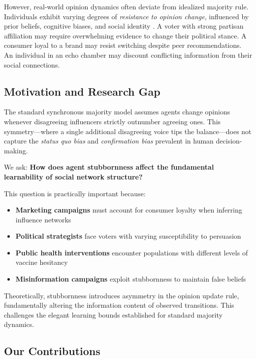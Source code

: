 \documentclass[conference]{IEEEtran}
\begin{document}
However, real-world opinion dynamics often deviate from idealized majority rule. Individuals exhibit varying degrees of \emph{resistance to opinion change}, influenced by prior beliefs, cognitive biases, and social identity \cite{auletta2015minority}. A voter with strong partisan affiliation may require overwhelming evidence to change their political stance. A consumer loyal to a brand may resist switching despite peer recommendations. An individual in an echo chamber may discount conflicting information from their social connections.

\subsection{Motivation and Research Gap}

The standard synchronous majority model assumes agents change opinions whenever disagreeing influencers strictly outnumber agreeing ones. This symmetry---where a single additional disagreeing voice tips the balance---does not capture the \emph{status quo bias} and \emph{confirmation bias} prevalent in human decision-making. 

We ask: \textbf{How does agent stubbornness affect the fundamental learnability of social network structure?}

This question is practically important because:
\begin{itemize}
\item \textbf{Marketing campaigns} must account for consumer loyalty when inferring influence networks
\item \textbf{Political strategists} face voters with varying susceptibility to persuasion
\item \textbf{Public health interventions} encounter populations with different levels of vaccine hesitancy
\item \textbf{Misinformation campaigns} exploit stubbornness to maintain false beliefs
\end{itemize}

Theoretically, stubbornness introduces asymmetry in the opinion update rule, fundamentally altering the information content of observed transitions. This challenges the elegant learning bounds established for standard majority dynamics.

\subsection{Our Contributions}
\end{document}

